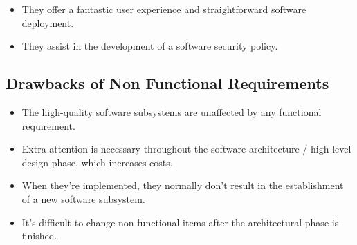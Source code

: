 \begin{itemize}
\item They offer a fantastic user experience and straightforward software deployment.
\item They assist in the development of a software security policy. 
\end{itemize}

\subsection{Drawbacks of Non Functional Requirements}
\begin{itemize}
\item The high-quality software subsystems are unaffected by any functional requirement.
\item Extra attention is necessary throughout the software architecture / high-level design phase, which increases costs.
\item When they're implemented, they normally don't result in the establishment of a new software subsystem.
\item It's difficult to change non-functional items after the architectural phase is finished.
\end{itemize}

